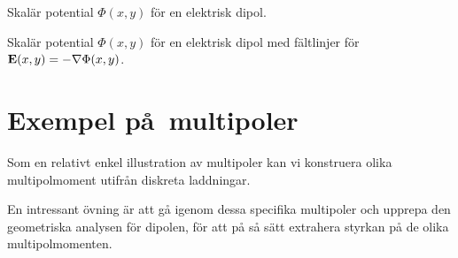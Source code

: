 \vfill\eject
\centerline{\epsfxsize=144mm}
\noindent
{\captionwide Skal{\"a}r potential $\Phi(x,y)$ f{\"o}r en elektrisk dipol.}
\medskip
\centerline{\epsfxsize=144mm}
\noindent
{\captionwide Skal{\"a}r potential $\Phi(x,y)$ f{\"o}r en elektrisk dipol med
f{\"a}ltlinjer f{\"o}r ${\bf E}(x,y)=-\nabla\Phi(x,y)$.}

\section{Exempel p\aa\ multipoler}
Som en relativt enkel illustration av multipoler kan vi konstruera olika
multipolmoment utifr{\aa}n diskreta laddningar.
\bigskip
\centerline{}
\medskip
\noindent
\bigskip
\centerline{}
\medskip
\noindent
En intressant {\"o}vning {\"a}r att g{\aa} igenom dessa specifika multipoler
och upprepa den geometriska analysen f{\"o}r dipolen, f{\"o}r att p{\aa} s{\aa}
s{\"a}tt extrahera styrkan p{\aa} de olika multipolmomenten.

